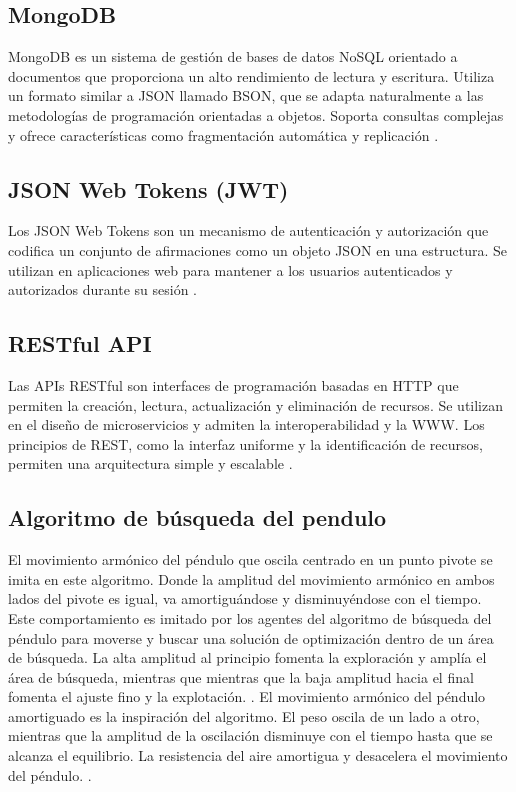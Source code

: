 \documentclass[conference]{IEEEtran}
\begin{document}
\subsection{MongoDB}
MongoDB es un sistema de gestión de bases de datos NoSQL orientado a documentos
que proporciona un alto rendimiento de lectura y escritura. Utiliza un formato
similar a JSON llamado BSON, que se adapta naturalmente a las metodologías de
programación orientadas a objetos. Soporta consultas complejas y ofrece
características como fragmentación automática y replicación
\cite{krishnan2016}.

\subsection{JSON Web Tokens (JWT)}
Los JSON Web Tokens son un mecanismo de autenticación y autorización que
codifica un conjunto de afirmaciones como un objeto JSON en una estructura. Se
utilizan en aplicaciones web para mantener a los usuarios autenticados y
autorizados durante su sesión \cite{IETF2015}.

\subsection{RESTful API}
Las APIs RESTful son interfaces de programación basadas en HTTP que permiten la
creación, lectura, actualización y eliminación de recursos. Se utilizan en el
diseño de microservicios y admiten la interoperabilidad y la WWW. Los
principios de REST, como la interfaz uniforme y la identificación de recursos,
permiten una arquitectura simple y escalable \cite{ehsan2022}.

\subsection{Algoritmo de búsqueda del pendulo}
El movimiento armónico del péndulo que oscila centrado en un punto pivote se
imita en este algoritmo. Donde la amplitud del movimiento armónico en ambos
lados del pivote es igual, va amortiguándose y disminuyéndose con el tiempo.
Este comportamiento es imitado por los agentes del algoritmo de búsqueda del
péndulo para moverse y buscar una solución de optimización dentro de un área de
búsqueda. La alta amplitud al principio fomenta la exploración y amplía el área
de búsqueda, mientras que mientras que la baja amplitud hacia el final fomenta
el ajuste fino y la explotación. \cite{aziz2022}.
El movimiento armónico del péndulo amortiguado es la inspiración del algoritmo.
El peso oscila de un lado a otro, mientras que la amplitud de la oscilación
disminuye con el tiempo hasta que se alcanza el equilibrio. La resistencia del
aire amortigua y desacelera el movimiento del péndulo. \cite{aziz2022}.
\end{document}
